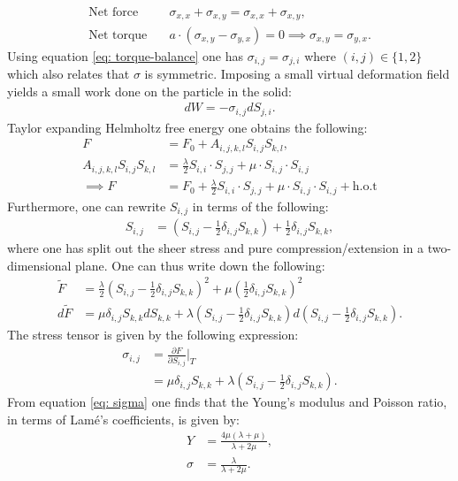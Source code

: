 \documentclass{article}
\begin{document}
\begin{align}
    \text{Net force}\quad & \sigma_{x,x} + \sigma_{x,y} = \sigma_{x,x} + \sigma_{x,y},\\
    \text{Net torque}\quad & a \cdot \left(\sigma_{x,y}-\sigma_{y,x}\right) = 0\implies \sigma_{x,y} = \sigma_{y,x}.\label{eq: torque-balance}
\end{align}Using equation \eqref{eq: torque-balance} one has $\sigma_{i,j} = \sigma_{j,i}$ where $(i,j)\in\{1,2\}$ which also relates that $\sigma$ is symmetric.
Imposing a small virtual deformation field yields a small work done on the particle in the solid:
\begin{align*}
    d W = - \sigma_{i,j}d S_{j,i}.
\end{align*}Taylor expanding Helmholtz free energy one obtains the following:
\begin{align*}
    F &= F_0 + A_{i,j,k,l}S_{i,j}S_{k,l},\\
    A_{i,j,k,l}S_{i,j}S_{k,l} &= \frac{\lambda}{2} S_{i,i}\cdot S_{j,j} + \mu \cdot S_{i,j}\cdot S_{i,j}\\
    \implies F &= F_0 + \frac{\lambda}{2} S_{i,i}\cdot S_{j,j} + \mu \cdot S_{i,j}\cdot S_{i,j} + \text{h.o.t} 
\end{align*}Furthermore, one can rewrite $S_{i,j}$ in terms of the following:
\begin{align*}
    S_{i,j} &= (S_{i,j} - \frac{1}{2}\delta_{i,j}S_{k,k}) + \frac{1}{2}\delta_{i,j}S_{k,k},
\end{align*}where one has split out the sheer stress and pure compression/extension in a two-dimensional plane. 
One can thus write down the following:
\begin{align*}
    \tilde{F} &= \frac{\lambda}{2}\left(S_{i,j} - \frac{1}{2}\delta_{i,j}S_{k,k}\right)^2 + \mu\left(\frac{1}{2}\delta_{i,j}S_{k,k}\right)^2\\
    d\tilde{F} &= \mu \delta_{i,j}S_{k,k}dS_{k,k} + \lambda\left(S_{i,j} - \frac{1}{2}\delta_{i,j}S_{k,k}\right)d\left(S_{i,j} - \frac{1}{2}\delta_{i,j}S_{k,k}\right).
\end{align*}
The stress tensor is given by the following expression:
\begin{align}
    \sigma_{i,j} &= \frac{\partial F}{\partial S_{i,j}}\Bigg|_T\label{eq: sigma}\\
    &= \mu \delta_{i,j}S_{k,k}  + \lambda \left(S_{i,j} - \frac{1}{2}\delta_{i,j}S_{k,k}\right).\nonumber
\end{align}From equation \eqref{eq: sigma} one finds that the Young's modulus and Poisson ratio, in terms of Lamé's coefficients, is given by:
\begin{align*}
    Y &= \frac{4\mu(\lambda + \mu)}{\lambda + 2\mu},\\
    \sigma &= \frac{\lambda}{\lambda + 2\mu}.
\end{align*}
\end{document}

